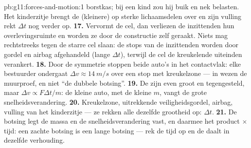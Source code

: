 \begin{solution}{pb:g11:forces-and-motion:1}
borstkas; bij een kind zou hij buik en nek belasten. Het kinderzitje
brengt de (kleinere)  op sterke lichaamsdelen over en zijn vulling
rekt $\Delta t$ nog verder op.
\textbf{17.} Vervormt de cel, dan verliezen de inzittenden hun
overlevingsruimte en worden ze door de constructie zelf geraakt. Niets
mag rechtstreeks tegen de starre cel slaan: de stops van de inzittenden
worden door gordel en airbag afgehandeld (lange $\Delta t$), terwijl de
cel de kreukelende uiteinden verankert.
\textbf{18.} Door de symmetrie stoppen beide auto's in het contactvlak:
elke bestuurder ondergaat $\Delta v \approx \qty{14}{m/s}$ over een stop
met kreukelzone --- in wezen de muurproef, en niet ``de dubbele
botsing''.
\textbf{19.} De  zijn even groot en tegengesteld, maar
$\Delta v \propto F\Delta t/m$: de kleine auto, met de kleine $m$, vangt
de grote snelheidsverandering.
\textbf{20.} Kreukelzone, uitrekkende veiligheidsgordel, airbag, vulling
van het kinderzitje --- ze rekken alle dezelfde grootheid op:
$\Delta t$.
\textbf{21.} De botsing legt de massa en de snelheidsverandering vast, en
daarmee het product  $\times$ tijd: een zachte botsing is een lange
botsing --- rek de tijd op en de  daalt in dezelfde verhouding.
\end{solution}
